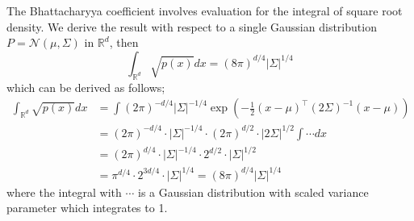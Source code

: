 \documentclass[11pt]{article}
\newcommand{\calN}{\mathcal{N}}
\newcommand{\bbR}{\mathbb{R}}
\begin{document}
\begin{Facts}
	The Bhattacharyya coefficient involves evaluation for the integral of square root density. We derive the result with respect to a single Gaussian distribution  $P = \calN(\mu,\Sigma)$ in $\bbR^d$, then
	\begin{equation*}
		\int_{\bbR^d} \sqrt{p(x)} dx = (8\pi)^{d/4} |\Sigma|^{1/4}
	\end{equation*}
	which can be derived as follows;
	\begin{align*}
		\int_{\bbR^d} \sqrt{p(x)} dx &= \int (2\pi)^{-d/4} |\Sigma|^{-1/4} \exp \left(-\frac{1}{2} (x-\mu)^\top (2\Sigma)^{-1} (x-\mu) \right) \\
		&=(2\pi)^{-d/4} \cdot |\Sigma|^{-1/4}\cdot (2\pi)^{d/2}\cdot |2\Sigma|^{1/2} \int \cdots dx \\
		&= (2\pi)^{d/4}\cdot |\Sigma|^{-1/4} \cdot 2^{d/2} \cdot|\Sigma|^{1/2} \\
		&= \pi^{d/4} \cdot2^{3d/4} \cdot|\Sigma|^{1/4} = (8\pi)^{d/4} |\Sigma|^{1/4}
	\end{align*}
	where the integral with $\cdots$ is a Gaussian distribution with scaled variance parameter which integrates to 1. 
\end{Facts}



\end{document}
